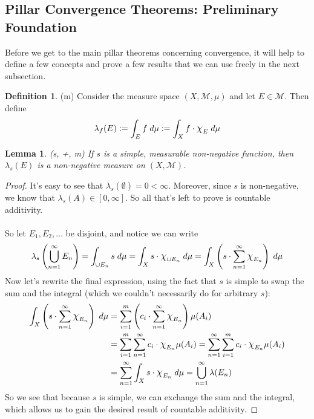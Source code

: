\documentclass[12pt]{article}
\theoremstyle{plain}
\newtheorem{lem}[thm]{Lemma}
\theoremstyle{definition}
\newtheorem{defn}[thm]{Definition}
\theoremstyle{remark}
\newcommand*{\Chi}{\mbox{\large$\chi$}} %
\begin{document}
\newpage
\subsection{Pillar Convergence Theorems: Preliminary Foundation}

Before we get to the main pillar theorems concerning convergence, it will help to define a few concepts and prove a few results that we can use freely in the next subsection.

\begin{defn} (m)
Consider the measure space $(X,\mathscr{M},\mu)$ and let $E\in\mathscr{M}$. Then define
\[
    \lambda_f(E) := \int_E f \; d\mu 
    := \int_X f\cdot\Chi_E \;d\mu
\]
\end{defn}

\begin{lem} \emph{(s, +, m)}
\label{measurelem}
If $s$ is a simple, measurable non-negative function, then $\lambda_s(E)$ is a non-negative measure on $(X,\mathscr{M})$.
\end{lem}
\begin{proof}
It's easy to see that $\lambda_s(\emptyset) = 0<\infty$. Moreover, since $s$ is non-negative, we know that $\lambda_s(A) \in [0,\infty]$. So all that's left to prove is countable additivity.
\\
\\
So let $E_1, E_2,\ldots$ be disjoint, and notice we can write
\[
    \lambda_s\left(\bigcup^\infty_{n=1} E_n\right)
    = \int_{\cup E_n} s \;d\mu =
    \int_{X} s \cdot \Chi_{\cup E_n}\;d\mu =
    \int_{X} \left(s \cdot  
    \sum^\infty_{n=1}\Chi_{E_n}\right)\;d\mu 
\]
Now let's rewrite the final expression, using the fact that $s$ is simple to swap the sum and the integral (which we couldn't necessarily do for arbitrary $s$):
\begin{align*}
    \int_{X} \left(s \cdot  \sum^\infty_{n=1}
    \Chi_{E_n}\right)\;d\mu 
    &= \sum^m_{i=1} \left(c_i \cdot  
    \sum^\infty_{n=1}\Chi_{E_n} 
    \right)\mu(A_i) \\
    &= \sum^m_{i=1} \sum^\infty_{n=1}c_i \cdot \Chi_{E_n} 
    \mu(A_i)
    =  \sum^\infty_{n=1}\sum^m_{i=1} c_i \cdot \Chi_{E_n} 
    \mu(A_i) \\
    &=   \sum^\infty_{n=1}\int_X s \cdot \Chi_{E_n} 
        \; d\mu =  \bigcup^\infty_{n=1}\lambda(E_n)
\end{align*}
So we see that because $s$ is simple, we can exchange the sum and the integral, which allows us to gain the desired result of countable additivity.
\end{proof}
\end{document}
